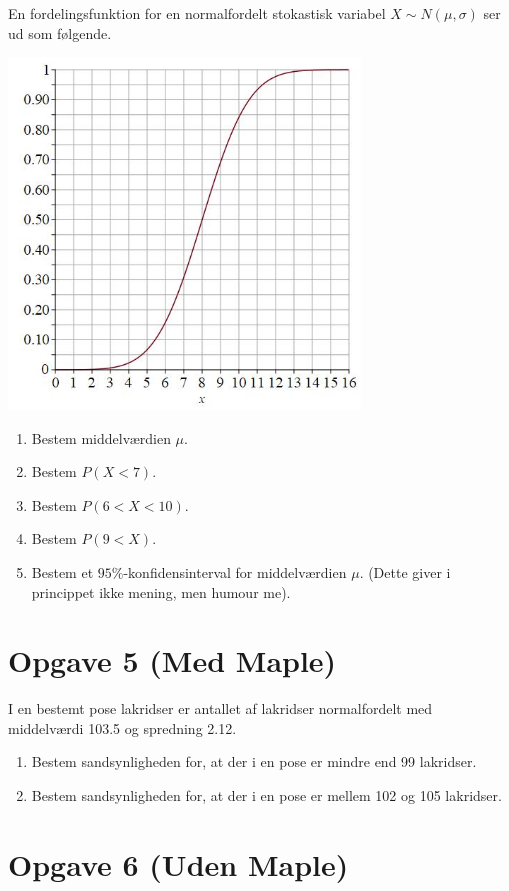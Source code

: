 En fordelingsfunktion for en normalfordelt stokastisk variabel $X\sim N(\mu,\sigma)$ ser ud som følgende.
\begin{center}
	\includegraphics[width=0.7\textwidth]{Billeder/fordeling.jpg}
\end{center}
\begin{enumerate}[label=\roman*)]
	\item Bestem middelværdien $\mu$. 
	\item Bestem $P(X<7)$.
	\item Bestem $P(6<X<10)$. 
	\item Bestem $P(9<X)$.
	\item Bestem et $95\%$-konfidensinterval for middelværdien $\mu$. (Dette giver i princippet ikke mening, men humour me).
\end{enumerate}

\section*{Opgave 5 (Med Maple)}

I en bestemt pose lakridser er antallet af lakridser normalfordelt med middelværdi 103.5 og spredning 2.12. 
\begin{enumerate}[label=\roman*)]
	\item Bestem sandsynligheden for, at der i en pose er mindre end 99 lakridser. 
	\item Bestem sandsynligheden for, at der i en pose er mellem 102 og 105 lakridser. 
\end{enumerate}

\section*{Opgave 6 (Uden Maple)}

